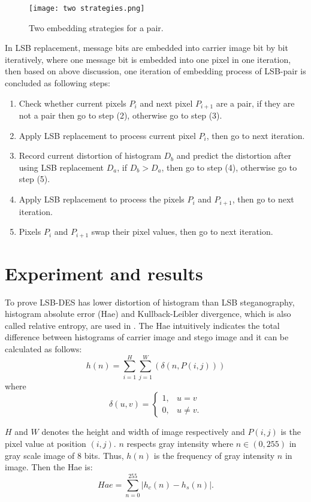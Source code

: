 \documentclass[a4paper,10pt,twocolumn]{article}
\begin{document}
\begin{figure}
 \texttt{[image: two strategies.png]}
 \caption{Two embedding strategies for a pair.}
\end{figure}


In LSB replacement, message bits are embedded into carrier image bit by bit iteratively,
where one message bit is embedded into one pixel in one iteration, then based on above
discussion, one iteration of embedding process of LSB-pair is concluded as following steps:
\begin{enumerate}
 \item Check whether current pixels $P_i$ and next pixel $P_{i+1}$ are a pair, if they are
       not a pair then go to step (2), otherwise go to step (3).
 \item Apply LSB replacement to process current pixel $P_i$, then go to next iteration.
 \item Record current distortion of histogram $D_b$ and predict the distortion after using
       LSB replacement $D_a$, if $D_b > D_a$, then go to step (4), otherwise go to step (5).
 \item Apply LSB replacement to process the pixels $P_i$ and $P_{i+1}$, then go to next iteration.
 \item Pixels $P_i$ and $P_{i+1}$ swap their pixel values, then go to next iteration.
\end{enumerate}


\section{Experiment and results}

To prove LSB-DES has lower distortion of histogram than LSB steganography, histogram
absolute error (Hae) and Kullback-Leibler divergence, which is also called relative
entropy, are used in \cite{c3}. The Hae intuitively indicates the total difference between
histograms of carrier image and stego image and it can be calculated as follows:
$$ h(n) = \sum_{i=1}^H \sum_{j=1}^W (\delta(n, P(i,j))) $$
where
$$ \delta(u,v) = \begin{cases} 1, & u=v \\ 0, & u \neq v. \end{cases}$$

$H$ and $W$ denotes the height and width of image respectively and $P(i,j)$ is
the pixel value at position $(i,j)$. $n$ respects gray intensity where $n \in (0,255)$
in gray scale image of 8 bits. Thus, $h(n)$ is the frequency of gray intensity $n$ in image.
Then the Hae is:
$$ Hae = \sum_{n=0}^{255} |h_c(n)-h_s(n)|. $$
\end{document}

